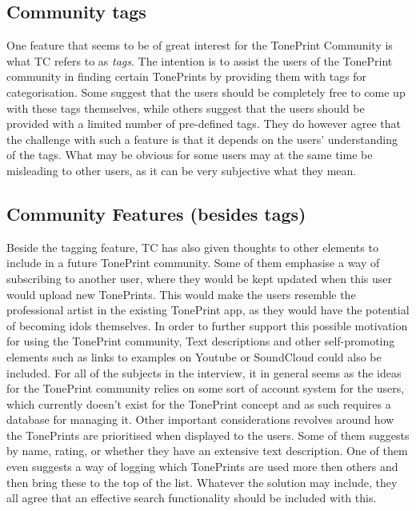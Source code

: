 \subsection*{Community tags} 
\label{App:ThemeCommunityTags}
One feature that seems to be of great interest for the TonePrint Community is what TC refers to as \textit{tags}. The intention is to assist the users of the TonePrint community in finding certain TonePrints by providing them with tags for categorisation. Some suggest that the users should be completely free to come up with these tags themselves, while others suggest that the users should be provided with a limited number of pre-defined tags. They do however agree that the challenge with such a feature is that it depends on the users' understanding of the tags. What may be obvious for some users may at the same time be misleading to other users, as it can be very subjective what they mean.

\subsection*{Community Features (besides tags)}
\label{App:ThemeCommunityFeaturesNotTags}
Beside the tagging feature, TC has also given thoughts to other elements to include in a future TonePrint community. Some of them emphasise a way of subscribing to another user, where they would be kept updated when this user would upload new TonePrints. This would make the users resemble the professional artist in the existing TonePrint app, as they would have the potential of becoming idols themselves. In order to further support this possible motivation for using the TonePrint community, Text descriptions and other self-promoting elements such as links to examples on Youtube or SoundCloud could also be included. For all of the subjects in the interview, it in general seems as the ideas for the TonePrint community relies on some sort of account system for the users, which currently doesn't exist for the TonePrint concept and as such requires a database for managing it. Other important considerations revolves around how the TonePrints are prioritised when displayed to the users. Some of them suggests by name, rating, or whether they have an extensive text description. One of them even suggests a way of logging which TonePrints are used more then others and then bring these to the top of the list. Whatever the solution may include, they all agree that an effective search functionality should be included with this.

